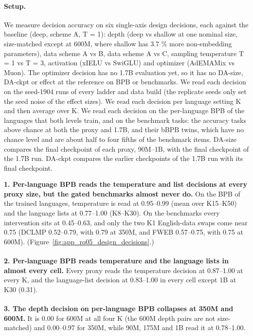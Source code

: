 {\begin{minipage}[t]{0.485\textwidth}
\paragraph{Setup.} We measure decision accuracy on six single-axis design decisions, each against the baseline (deep, scheme A, T = 1): depth (deep vs shallow at one nominal size, size-matched except at 600M, where shallow has 3.7 \% more non-embedding parameters), data scheme A vs B, data scheme A vs C, sampling temperature T = 1 vs T = 3, activation (xIELU vs SwiGLU) and optimizer (AdEMAMix vs Muon). The optimizer decision has no 1.7B evaluation yet, so it has no DA-size, DA-ckpt or effect at the reference on BPB or benchmarks. We read each decision on the seed-1904 runs of every ladder and data build (the replicate seeds only set the seed noise of the effect sizes). We read each decision per language setting K and then average over K. We read each decision on the per-language BPB of the languages that both levels train, and on the benchmark tasks: the accuracy tasks above chance at both the proxy and 1.7B, and their bBPB twins, which have no chance level and are about half to four fifths of the benchmark items. DA-size compares the final checkpoint of each proxy, 90M--1B, with the final checkpoint of the 1.7B run. DA-ckpt compares the earlier checkpoints of the 1.7B run with its final checkpoint.
\end{minipage}\hfill
\begin{minipage}[t]{0.485\textwidth}
\vspace{0pt}
\begin{rqfinding}
\textbf{1. Per-language BPB reads the temperature and list decisions at every proxy size, but the gated benchmarks almost never do.} On the BPB of the trained languages, temperature is read at 0.95--0.99 (mean over K15--K50) and the language lists at 0.77--1.00 (K8--K30). On the benchmarks every intervention sits at 0.45--0.63, and only the two K1 English-data swaps come near 0.75 (DCLMP 0.52--0.79, with 0.79 at 350M, and FWEB 0.57--0.75, with 0.75 at 600M). (Figure~\ref{fig:app_rq05_design_decisions}.)
\\
\\
\textbf{2. Per-language BPB reads temperature and the language lists in almost every cell.} Every proxy reads the temperature decision at 0.87--1.00 at every K, and the language-list decision at 0.83--1.00 in every cell except 1B at K30 (0.31).
\\
\\
\textbf{3. The depth decision on per-language BPB collapses at 350M and 600M.} It is 0.00 for 600M at all four K (the 600M depth pairs are not size-matched) and 0.00--0.97 for 350M, while 90M, 175M and 1B read it at 0.78--1.00.
\end{rqfinding}
\end{minipage}

}
